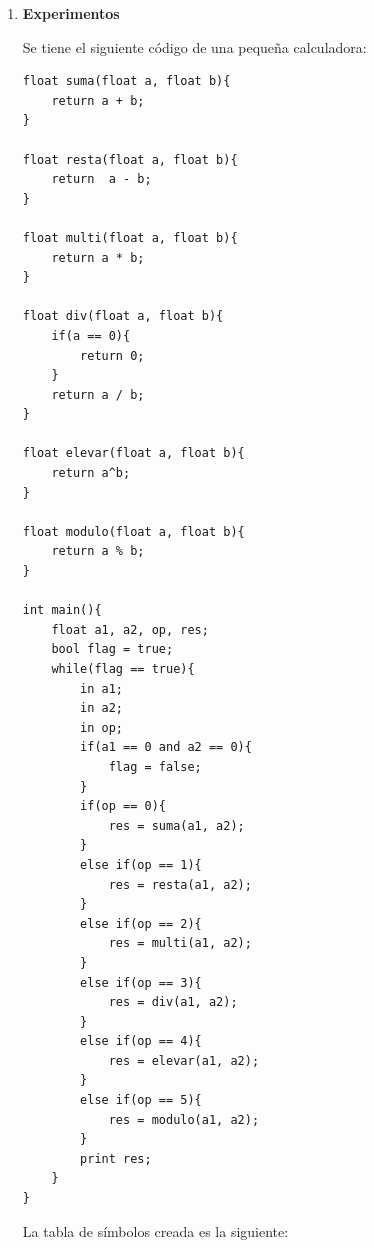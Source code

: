 \documentclass[a4paper,12pt]{article}
\begin{document}
\begin{enumerate}
\begin{enumerate}
\begin{itemize}
\begin{lstlisting}
		}
	}
}

void interprete(){
	Funciones[0].nombre = "global";
	for(int i = 0; i < tamTC; i++){
		Funciones[0].cod[Funciones[0].tamCod++] = TC[i];
	}
	tamFunciones++;
	runCode("global");
}

  \end{lstlisting}
  Cuando se encuentra una instrucción FUN se crea una entrada en una tabla de funciones de código, y todas las instrucciones que vienen después hasta el END
  se guardan dentro de esa entrada; no se ejecuta ninguna instrucción. Cuando se encuentra la instrucción SALTAR, SALTARV o SALTARF se busca la función en la
  tabla de funciones de código y se ejecuta el código guardado. Por esta razón la función \textit{interprete} crea primero la entrada de la función \textit{global}
  y pone dentro todo el código intermedio generado, luego lo ejecuta.


  \end{itemize}

  
 \end{enumerate}

 \item \textbf{Experimentos} 
 
 Se tiene el siguiente código de una pequeña calculadora:
 
 \begin{lstlisting}
float suma(float a, float b){
	return a + b;
}

float resta(float a, float b){
	return  a - b;
}

float multi(float a, float b){
	return a * b;
}

float div(float a, float b){
	if(a == 0){
		return 0;
	}
	return a / b;
}

float elevar(float a, float b){
	return a^b;
}

float modulo(float a, float b){
	return a % b;
}

int main(){
	float a1, a2, op, res;
	bool flag = true;
	while(flag == true){
		in a1;
		in a2;
		in op;
		if(a1 == 0 and a2 == 0){
			flag = false;
		}
		if(op == 0){
			res = suma(a1, a2);
		}
		else if(op == 1){
			res = resta(a1, a2);
		}
		else if(op == 2){
			res = multi(a1, a2);
		}
		else if(op == 3){
			res = div(a1, a2);
		}
		else if(op == 4){
			res = elevar(a1, a2);
		}
		else if(op == 5){
			res = modulo(a1, a2);
		}
		print res;
	}
}

 \end{lstlisting}
 
  La tabla de símbolos creada es la siguiente:
  

\end{enumerate}
\end{document}
